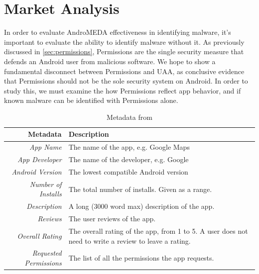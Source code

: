 \chapter{Market Analysis}
\label{sec:market}

In order to evaluate AndroMEDA effectiveness in identifying malware, it's important to evaluate the ability to identify malware without it. As previously discussed in \ref{sec:permissions}, Permissions are the single security measure that defends an Android user from malicious software. We hope to show a fundamental disconnect between Permissions and UAA, as conclusive evidence that Permissions should not be the sole security system on Android. In order to study this, we must examine the how Permissions reflect app behavior, and if known malware can be identified with Permissions alone.



\begin{table}[t]
\begin{small}
\begin{tabular}{r|l}
Metadata & Description \\
\hline

\textit{App Name} & The name of the app, e.g. Google Maps  \\
\textit{App Developer} & The name of the developer, e.g. Google  \\
\textit{Android Version} & The lowest compatible Android version  \\
\textit{Number of Installs} &  The total number of installs. Given as a range. \\
\textit{Description} &  A long (3000 word max) description of the app. \\
\textit{Reviews} &  The user reviews of the app. \\
\textit{Overall Rating} &  The overall rating of the app, from 1 to 5. A user does not need to write a review to leave a rating. \\
\textit{Requested Permissions} &  The list of all the permissions the app requests. \\

\end{tabular}
\end{small}
\caption{Metadata from }
\label{tab:marketmetadata}
\end{table}


